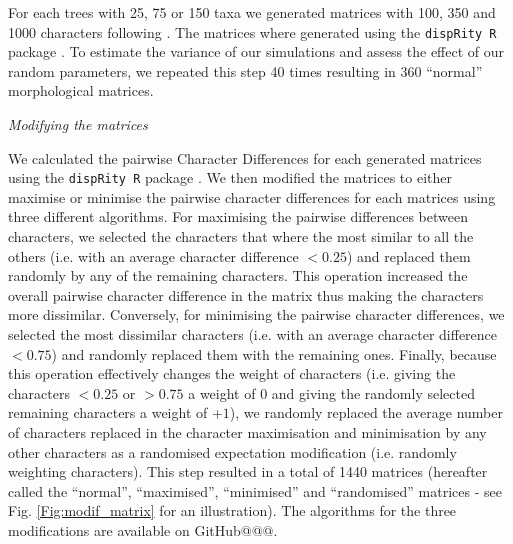 \documentclass[12pt,letterpaper]{article}
\renewcommand{\subsection}[1]{%
\bigskip
\begin{center}
\begin{large}
\normalfont\itshape #1
\end{large}
\end{center}}
\begin{document}
For each trees with 25, 75 or 150 taxa we generated matrices with 100, 350 and 1000 characters following \cite{OReilly20160081}.
The matrices where generated using the \texttt{dispRity R} package \citep{thomas_guillerme_2016_55646}.
To estimate the variance of our simulations and assess the effect of our random parameters, we repeated this step 40 times resulting in 360 ``normal'' morphological matrices.

\subsection{Modifying the matrices}
We calculated the pairwise Character Differences for each generated matrices using the \texttt{dispRity R} package \citep{thomas_guillerme_2016_55646}. %
We then modified the matrices to either maximise or minimise the pairwise character differences for each matrices using three different algorithms.
For maximising the pairwise differences between characters, we selected the characters that where the most similar to all the others (i.e. with an average character difference $<$$0.25$) and replaced them randomly by any of the remaining characters.
This operation increased the overall pairwise character difference in the matrix thus making the characters more dissimilar.
Conversely, for minimising the pairwise character differences, we selected the most dissimilar characters (i.e. with an average character difference $<$$0.75$) and randomly replaced them with the remaining ones.
Finally, because this operation effectively changes the weight of characters (i.e. giving the characters $<$$0.25$ or $>$$0.75$ a weight of $0$ and giving the randomly selected remaining characters a weight of +$1$), we randomly replaced the average number of characters replaced in the character maximisation and minimisation by any other characters as a randomised expectation modification (i.e. randomly weighting characters).
This step resulted in a total of 1440 matrices (hereafter called the ``normal'', ``maximised'', ``minimised'' and ``randomised'' matrices - see Fig. \ref{Fig:modif_matrix} for an illustration).
The algorithms for the three modifications are available on GitHub@@@. %
\end{document}
